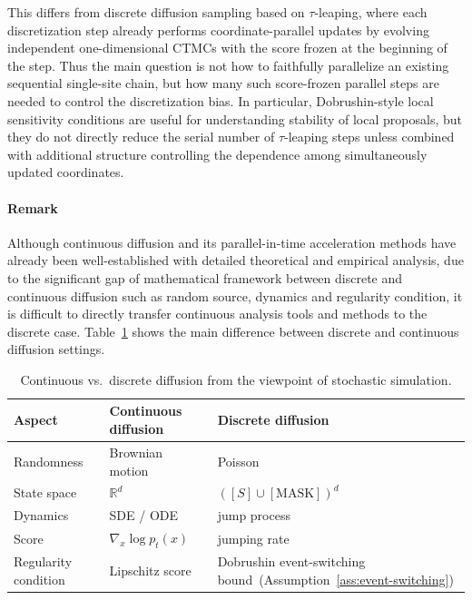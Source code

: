 \documentclass{article}
\begin{document}
This differs from discrete diffusion sampling based on $\tau$-leaping, where each discretization step already performs coordinate-parallel updates by evolving independent one-dimensional CTMCs with the score frozen at the beginning of the step. Thus the main question is not how to faithfully
parallelize an existing sequential single-site chain, but how many such score-frozen parallel steps are needed to control the discretization bias. In particular, Dobrushin-style local sensitivity conditions are useful for understanding stability of local proposals, but they do not directly reduce the serial number of $\tau$-leaping steps unless combined with additional structure controlling the dependence among simultaneously updated coordinates.

\paragraph{Remark}

Although continuous diffusion and its parallel-in-time acceleration methods have already been well-established with detailed theoretical and empirical analysis, due to the significant gap of mathematical framework between discrete and continuous diffusion such as random source, dynamics and regularity condition, it is difficult to directly transfer continuous analysis tools and methods to the discrete case. Table~\ref{tab:cont-vs-disc-diffusion-short} shows the main difference between discrete and continuous diffusion settings.



\begin{table}[ht]
\centering
\captionsetup{skip=8pt}
\caption{Continuous vs.\ discrete diffusion from the viewpoint of stochastic simulation.}
\label{tab:cont-vs-disc-diffusion-short}
\small
\renewcommand{\arraystretch}{1.1}
\begin{tabularx}{\columnwidth}{>{\raggedright\arraybackslash}p{}
>{\raggedright\arraybackslash}X
>{\raggedright\arraybackslash}X}
\toprule
\textbf{Aspect} & \textbf{Continuous diffusion} & \textbf{Discrete diffusion} \\
\midrule
Randomness & Brownian motion & Poisson \\
State space & $\mathbb{R}^d$ & $([S]\cup [\mathrm{MASK}])^d$ \\
Dynamics & SDE / ODE & jump process \\
Score & $\nabla_x\log p_t(x)$ & jumping rate \\
Regularity condition & Lipschitz score & Dobrushin event-switching bound~(Assumption~\ref{ass:event-switching}) \\
\bottomrule
\end{tabularx}
\end{table}
\end{document}
